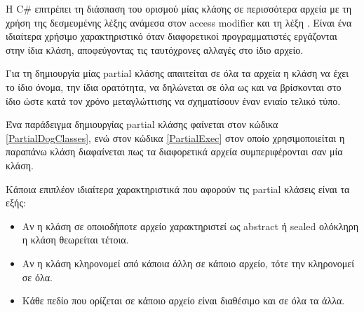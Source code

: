 H C\# επιτρέπει τη διάσπαση του ορισμού μίας κλάσης σε περισσότερα αρχεία με τη χρήση της δεσμευμένης λέξης  ανάμεσα στον access modifier και τη λέξη . Είναι ένα ιδιαίτερα χρήσιμο χαρακτηριστικό όταν διαφορετικοί προγραμματιστές εργάζονται στην ίδια κλάση, αποφεύγοντας τις ταυτόχρονες αλλαγές στο ίδιο αρχείο.

Για τη δημιουργία μίας partial κλάσης απαιτείται σε όλα τα αρχεία η κλάση να έχει το ίδιο όνομα, την ίδια ορατότητα, να δηλώνεται σε όλα ως  και να βρίσκονται στο ίδιο  ώστε κατά τον χρόνο μεταγλώττισης να σχηματίσουν έναν ενιαίο τελικό τύπο.



Ένα παράδειγμα δημιουργίας partial κλάσης φαίνεται στον κώδικα \ref{PartialDogClasses}, ενώ στον κώδικα \ref{PartialExec} στον οποίο χρησιμοποιείται η παραπάνω κλάση διαφαίνεται πως τα διαφορετικά αρχεία συμπεριφέρονται σαν μία κλάση.



Κάποια επιπλέον ιδιαίτερα χαρακτηριστικά που αφορούν τις partial κλάσεις είναι τα εξής:
\begin{itemize}
    \item Αν η κλάση σε οποιοδήποτε αρχείο χαρακτηριστεί ως abstract ή sealed ολόκληρη η κλάση θεωρείται τέτοια.
    \item Αν η κλάση κληρονομεί από κάποια άλλη σε κάποιο αρχείο, τότε την κληρονομεί σε όλα.
    \item Κάθε πεδίο που ορίζεται σε κάποιο αρχείο είναι διαθέσιμο και σε όλα τα άλλα.
\end{itemize}